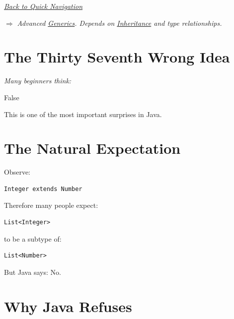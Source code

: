 \documentclass[11pt,a4paper]{book}
\begin{document}
\smallskip
\noindent
\hyperref[sec:quick_nav]{\emph{Back to Quick Navigation}}

\smallskip
\noindent
\textcolor{RosettaRoyalPurple}{$\Rightarrow$}
\emph{Advanced \hyperref[chap:generics]{Generics}. Depends on \hyperref[chap:inheritance]{Inheritance} and type relationships.}


\section{The Thirty Seventh Wrong Idea}

\begin{trap}

\emph{Many beginners think:}


\textcolor{RosettaOrange}{False}

This is one of the most
important surprises in Java.

\end{trap}

\section{The Natural Expectation}

Observe:

\begin{verbatim} 
Integer extends Number
\end{verbatim}

Therefore many people expect:

\begin{verbatim} 
List<Integer>
\end{verbatim}

to be a subtype of:

\begin{verbatim} 
List<Number>
\end{verbatim}

But Java says: 
\textcolor{RosettaOrange}{No}.

\newpage
\section{Why Java Refuses}
\end{document}
